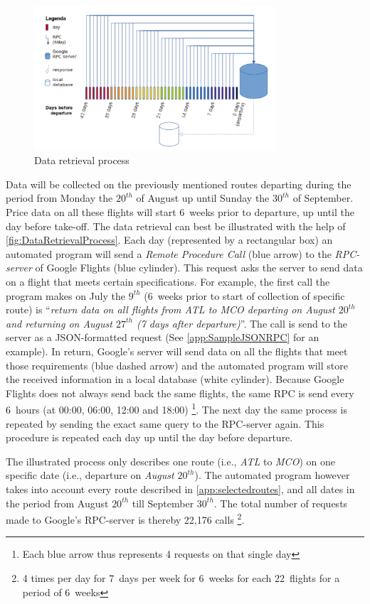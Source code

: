 \begin{figure}
\centering
\includegraphics[width=0.8\textwidth]{figures/DataRetrievalProcess}
\caption{Data retrieval process}
\label{fig:DataRetrievalProcess}
\end{figure}

Data will be collected on the previously mentioned routes departing during the period from Monday the $20^{th}$ of August up until Sunday the $30^{th}$ of September. Price data on all these flights will start 6~weeks prior to departure, up until the day before take-off. The data retrieval can best be illustrated with the help of \autoref{fig:DataRetrievalProcess}. Each day (represented by a rectangular box) an automated program will send a \emph{Remote Procedure Call} (blue arrow) to the \emph{RPC-server} of Google Flights (blue cylinder). This request asks the server to send data on a flight that meets certain specifications. For example, the first call the program makes on July the $9^{th}$ (6~weeks prior to start of collection of specific route) is ``\emph{return data on all flights from ATL to MCO departing on August $20^{th}$ and returning on August $27^{th}$ (7 days after departure)}''. The call is send to the server as a JSON-formatted request (See \autoref{app:SampleJSONRPC} for an example). In return, Google's server will send data on all the flights that meet those requirements (blue dashed arrow) and the automated program will store the received information in a local database (white cylinder). Because Google Flights does not always send back the same flights, the same RPC is send every 6~hours (at 00:00, 06:00, 12:00 and 18:00) \footnote{Each blue arrow thus represents 4 requests on that single day}. The next day the same process is repeated by sending the exact same query to the RPC-server again. This procedure is repeated each day up until the day before departure.

The illustrated process only describes one route (i.e., \emph{ATL} to \emph{MCO}) on one specific date (i.e., departure on \emph{August $20^{th}$}). The automated program however takes into account every route described in \autoref{app:selectedroutes}, and all dates in the period from August $20^{th}$ till September $30^{th}$. The total number of requests made to Google's RPC-server is thereby 22,176 calls \footnote{4 times per day for 7~days per week for 6~weeks for each 22~flights for a period of 6~weeks}.


